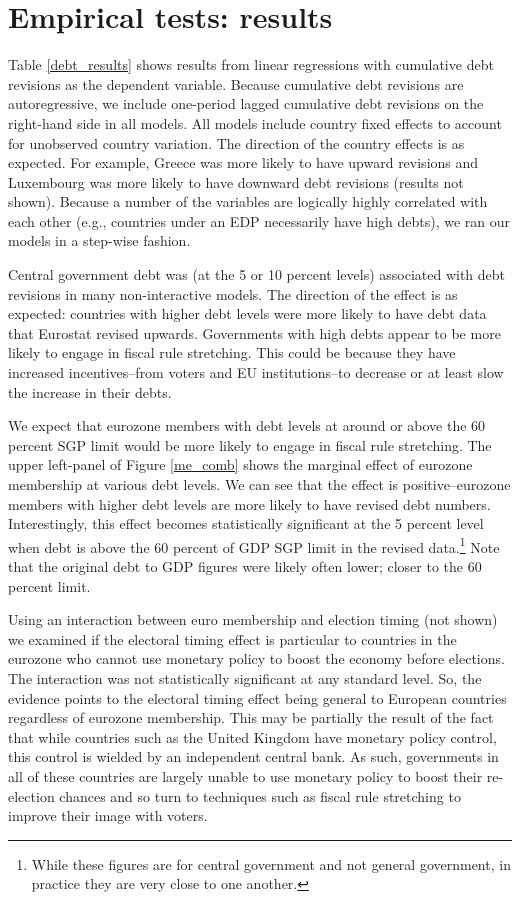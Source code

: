 \documentclass[]{article}
\begin{document}
\section{Empirical tests: results}

Table \ref{debt_results} shows results from linear regressions with cumulative debt revisions as the dependent variable. Because cumulative debt revisions are autoregressive, we include one-period lagged cumulative debt revisions on the right-hand side in all models. All models include country fixed effects to account for unobserved country variation. The direction of the country effects is as expected. For example, Greece was more likely to have upward revisions and Luxembourg was more likely to have downward debt revisions (results not shown). Because a number of the variables are logically highly correlated with each other (e.g., countries under an EDP necessarily have high debts), we ran our models in a step-wise fashion.

Central government debt was (at the 5 or 10 percent levels) associated with debt revisions in many non-interactive models. The direction of the effect is as expected: countries with higher debt levels were more likely to have debt data that Eurostat revised upwards. Governments with high debts appear to be more likely to engage in fiscal rule stretching. This could be because they have increased incentives--from voters and EU institutions--to decrease or at least slow the increase in their debts.

We expect that eurozone members with debt levels at around or above the 60 percent SGP limit would be more likely to engage in fiscal rule stretching. The upper left-panel of Figure \ref{me_comb} shows the marginal effect of eurozone membership at various debt levels. We can see that the effect is positive--eurozone members with higher debt levels are more likely to have revised debt numbers. Interestingly, this effect becomes statistically significant at the 5 percent level when debt is above the 60 percent of GDP SGP limit in the revised data.\footnote{While these figures are for central government and not general government, in practice they are very close to one another.} Note that the original debt to GDP figures were likely often lower; closer to the 60 percent limit.

Using an interaction between euro membership and election timing (not shown) we examined if the electoral timing effect is particular to countries in the eurozone who cannot use monetary policy to boost the economy before elections. The interaction was not statistically significant at any standard level. So, the evidence points to the electoral timing effect being general to European countries regardless of eurozone membership. This may be partially the result of the fact that while countries such as the United Kingdom have monetary policy control, this control is wielded by an independent central bank. As such, governments in all of these countries are largely unable to use monetary policy to boost their re-election chances and so turn to techniques such as fiscal rule stretching to improve their image with voters.
\end{document}
